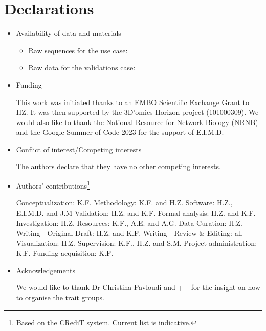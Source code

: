 \documentclass[sn-mathphys,Numbered]{sn-jnl}%
\theoremstyle{thmstyleone}%
\theoremstyle{thmstyletwo}%
\theoremstyle{thmstylethree}%
\begin{document}
\section*{Declarations}


    \begin{itemize}

        \item Availability of data and materials

        \begin{itemize}
            \item Raw sequences for the use case: 
            \item Raw data for the validations case:
        \end{itemize}


        \item Funding
        
            This work was initiated thanks to an EMBO Scientific Exchange Grant to HZ. 
            It was then supported by the 3D’omics Horizon project (101000309). 
            We would also like to thank the National Resource for Network Biology (NRNB) and the Google Summer of Code 2023 for the support of E.I.M.D.

        \item Conflict of interest/Competing interests 

            The authors declare that they have no other competing interests.

        \item Authors' contributions\footnote{Based on the \href{https://www-elsevier-com.kuleuven.e-bronnen.be/researcher/author/policies-and-guidelines/credit-author-statement}{CRediT system}. Current list is indicative.}

            Conceptualization: K.F.
            Methodology: K.F. and H.Z.
            Software: H.Z., E.I.M.D. and J.M
            Validation: H.Z. and K.F.
            Formal analysis: H.Z. and K.F.
            Investigation: H.Z.
            Resources: K.F., A.E. and A.G.
            Data Curation: H.Z.
            Writing - Original Draft: H.Z. and K.F. 
            Writing - Review \& Editing: all
            Visualization: H.Z.
            Supervision: K.F., H.Z. and S.M.
            Project administration: K.F.
            Funding acquisition: K.F.



        \item Acknowledgements

            We would like to thank Dr Christina Pavloudi and ++ for the insight on how to organise the trait groups.



\end{itemize}
\end{document}
